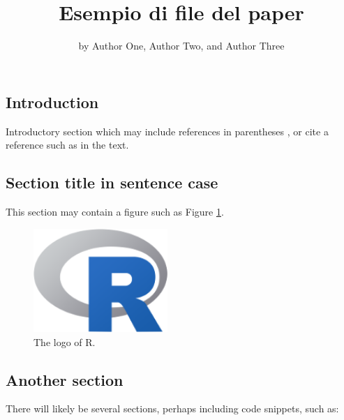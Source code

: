 \title{Esempio di file del paper}
\author{by Author One, Author Two, and Author Three}

\maketitle


\hypertarget{introduction}{%
\subsection{Introduction}\label{introduction}}

Introductory section which may include references in parentheses
\citep{R}, or cite a reference such as \citet{R} in the text.

\hypertarget{section-title-in-sentence-case}{%
\subsection{Section title in sentence
case}\label{section-title-in-sentence-case}}

This section may contain a figure such as Figure \ref{fig:Rlogo}.

\begin{Schunk}
\begin{figure}[htbp]

{\centering \includegraphics[width=2in]{Rlogo-5} 

}

\caption[The logo of R]{The logo of R.}\label{fig:Rlogo}
\end{figure}
\end{Schunk}

\hypertarget{another-section}{%
\subsection{Another section}\label{another-section}}

There will likely be several sections, perhaps including code snippets,
such as:

